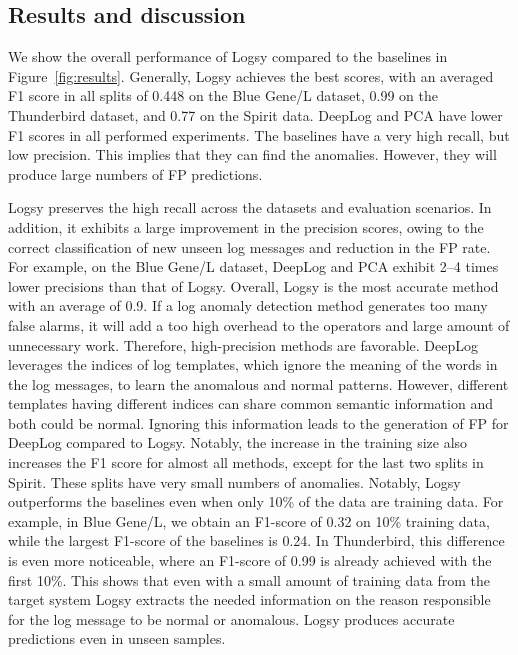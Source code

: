 \subsection{Results and discussion}
We show the overall performance of Logsy compared to the baselines in Figure~\ref{fig:results}. Generally, Logsy achieves the best scores, with an averaged F1 score in all splits of 0.448 on the Blue Gene/L dataset, 0.99 on the Thunderbird dataset, and 0.77 on the Spirit data. DeepLog and PCA have lower F1 scores in all performed experiments. The baselines have a very high recall, but low precision. This implies that they can find the anomalies. However, they will produce large numbers of FP predictions. 

Logsy preserves the high recall across the datasets and evaluation scenarios. In addition, it exhibits a large improvement in the precision scores, owing to the correct classification of new unseen log messages and reduction in the FP rate. For example, on the Blue Gene/L dataset, DeepLog and PCA exhibit 2--4 times lower precisions than that of Logsy. Overall, Logsy is the most accurate method with an average of 0.9. If a log anomaly detection method generates too many false alarms, it will add a too high overhead to the operators and large amount of unnecessary work. Therefore, high-precision methods are favorable. DeepLog leverages the indices of log templates, which ignore the meaning of the words in the log messages, to learn the anomalous and normal patterns. However, different templates having different indices can share common semantic information and both could be normal. Ignoring this information leads to the generation of FP for DeepLog compared to Logsy.
Notably, the increase in the training size also increases the F1 score for almost all methods, except for the last two splits in Spirit. These splits have very small numbers of anomalies. Notably, Logsy outperforms the baselines even when only 10\% of the data are training data. For example, in Blue Gene/L, we obtain an F1-score of 0.32 on 10\% training data, while the largest F1-score of the baselines is 0.24. In Thunderbird, this difference is even more noticeable, where an F1-score of 0.99 is already achieved with the first 10\%. This shows that even with a small amount of training data from the target system Logsy extracts the needed information on the reason responsible for the log message to be normal or anomalous. Logsy produces accurate predictions even in unseen samples.


